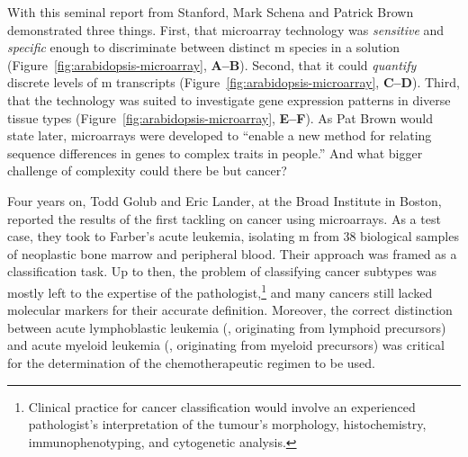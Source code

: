 \bigskip

With this seminal report from Stanford, Mark Schena and Patrick Brown
demonstrated three things.  First, that microarray technology was
\emph{sensitive} and \emph{specific} enough to discriminate between distinct
m species in a solution (Figure~\ref{fig:arabidopsis-microarray},
\textbf{A--B}).  Second, that it could \emph{quantify} discrete levels of
m transcripts (Figure~\ref{fig:arabidopsis-microarray},
\textbf{C--D}).  Third, that the technology was suited to investigate gene
expression patterns in diverse tissue types
(Figure~\ref{fig:arabidopsis-microarray}, \textbf{E--F}).  As Pat Brown would
state later, microarrays were developed to ``enable a new method for relating
sequence differences in genes to complex traits in people.''  And what bigger
challenge of complexity could there be but cancer?

Four years on, Todd Golub and Eric Lander, at the Broad Institute in Boston,
reported the results of the first tackling on cancer using
microarrays.\cite{golub_molecular_1999} As a test case, they took to Farber's
acute leukemia, isolating m from 38 biological samples of
neoplastic bone marrow and peripheral blood. Their approach was framed as a
classification task.  Up to then, the problem of classifying cancer subtypes was
mostly left to the expertise of the pathologist,\footnote{Clinical practice for
  cancer classification would involve an experienced pathologist's
  interpretation of the tumour's morphology, histochemistry, immunophenotyping,
  and cytogenetic analysis.} and many cancers still lacked molecular markers for
their accurate definition.  Moreover, the correct distinction between acute
lymphoblastic leukemia (, originating from lymphoid precursors)
and acute myeloid leukemia (, originating from myeloid
precursors) was critical for the determination of the chemotherapeutic regimen
to be used.

